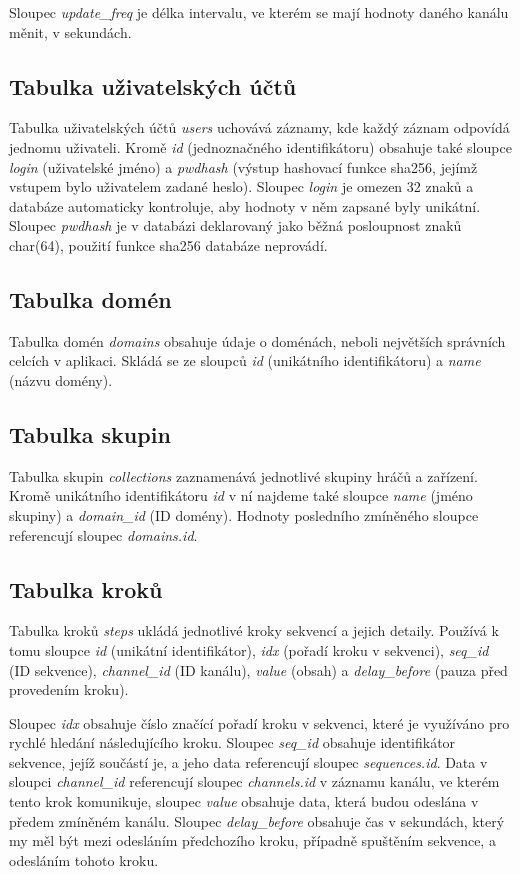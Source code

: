 Sloupec \emph{update\_freq} je délka intervalu, ve kterém se mají hodnoty daného kanálu měnit, v sekundách.

\subsection{Tabulka uživatelských účtů}

Tabulka uživatelských účtů \emph{users} uchovává záznamy, kde každý záznam odpovídá jednomu uživateli. Kromě \emph{id} (jednoznačného identifikátoru) obsahuje také sloupce \emph{login} (uživatelské jméno) a \emph{pwdhash} (výstup hashovací funkce sha256, jejímž vstupem bylo uživatelem zadané heslo). Sloupec \emph{login} je omezen 32 znaků a databáze automaticky kontroluje, aby hodnoty v něm zapsané byly unikátní. Sloupec \emph{pwdhash} je v databázi deklarovaný jako běžná posloupnost znaků char(64), použití funkce sha256 databáze neprovádí.

\subsection{Tabulka domén}

Tabulka domén \emph{domains} obsahuje údaje o doménách, neboli největších správních celcích v aplikaci. Skládá se ze sloupců \emph{id} (unikátního identifikátoru) a \emph{name} (názvu domény).

\subsection{Tabulka skupin}

Tabulka skupin \emph{collections} zaznamenává jednotlivé skupiny hráčů a zařízení. Kromě unikátního identifikátoru \emph{id} v ní najdeme také sloupce \emph{name} (jméno skupiny) a \emph{domain\_id} (ID domény). Hodnoty posledního zmíněného sloupce referencují sloupec \emph{domains.id}.

\subsection{Tabulka kroků}

Tabulka kroků \emph{steps} ukládá jednotlivé kroky sekvencí a jejich detaily. Používá k tomu sloupce \emph{id} (unikátní identifikátor), \emph{idx} (pořadí kroku v sekvenci), \emph{seq\_id} (ID sekvence), \emph{channel\_id} (ID kanálu), \emph{value} (obsah) a \emph{delay\_before} (pauza před provedením kroku).

Sloupec \emph{idx} obsahuje číslo značící pořadí kroku v sekvenci, které je využíváno pro rychlé hledání následujícího kroku. Sloupec \emph{seq\_id} obsahuje identifikátor sekvence, jejíž součástí je, a jeho data referencují sloupec \emph{sequences.id}. Data v sloupci \emph{channel\_id} referencují sloupec \emph{channels.id} v záznamu kanálu, ve kterém tento krok komunikuje, sloupec \emph{value} obsahuje data, která budou odeslána v předem zmíněném kanálu. Sloupec \emph{delay\_before} obsahuje čas v sekundách, který my měl být mezi odesláním předchozího kroku, případně spuštěním sekvence, a odesláním tohoto kroku.

